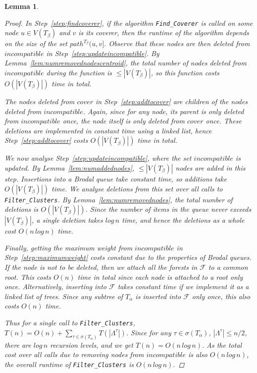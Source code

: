 \documentclass{article}
\newcommand{\leafset}{\Lambda}
\newcommand{\TA}{T_\alpha}
\newcommand{\TB}{T_\beta}
\newtheorem{filterclustersruntime}[incompatibility]{Lemma}
\begin{document}
\begin{filterclustersruntime}
\begin{proof}
            In Step~\ref{step:findcoverer}, if the algorithm \texttt{Find\_Coverer} is called on some node $u \in V(\TB)$ and $v$ is its coverer, then the runtime of the algorithm depends on the size of the set $path^{\TB}(u, v]$. Observe that these nodes are then deleted from $incompatible$ in Step~\ref{step:updateincompatible}. By Lemma~\ref{lem:numremovednodescentroid}, the total number of nodes deleted from $incompatible$ during the function is $\leq |V(\TB)|$, so this function costs $O(|V(\TB)|)$ time in total.

            The nodes deleted from $cover$ in Step~\ref{step:addtocover} are children of the nodes deleted from $incompatible$. Again, since for any node, its parent is only deleted from $incompatible$ once, the node itself is only deleted from $cover$ once. These deletions are implemented in constant time using a linked list, hence Step~\ref{step:addtocover} costs $O(|V(\TB)|)$ time in total.

            We now analyse Step~\ref{step:updateincompatible}, where the set $incompatible$ is updated. By Lemma~\ref{lem:numaddednodes}, $\leq |V(\TB)|$ nodes are added in this step. Insertions into a Brodal queue take constant time, so additions take $O(|V(\TB)|)$ time. We analyse deletions from this set over \textit{all} calls to \texttt{Filter\_Clusters}. By Lemma~\ref{lem:numremovednodes}, the total number of deletions is $O(|V(\TB)|)$. Since the number of items in the queue never exceeds $|V(\TB)|$, a single deletion takes $log\,n$ time, and hence the deletions as a whole cost $O(n\,log\,n)$ time.

            Finally, getting the maximum weight from $incompatible$ in Step~\ref{step:maximumweight} costs constant due to the properties of Brodal queues. If the node is not to be deleted, then we attach all the forests in $\mathcal{F}$ to a common root. This costs $O(n)$ time in total since each node is attached to a root only once. Alternatively, inserting into $\mathcal{F}$ takes constant time if we implement it as a linked list of trees. Since any subtree of $\TA$ is inserted into $\mathcal{F}$ only once, this also costs $O(n)$ time.

            Thus for a single call to \texttt{Filter\_Clusters}, $T(n) = O(n) + \sum_{\tau \in \sigma(\TA)} T(|\leafset^{\tau}|)$. Since for any $\tau \in \sigma(\TA)$, $|\leafset^{\tau}| \leq n/2$, there are $log\,n$ recursion levels, and we get $T(n) = O(n\,log\,n)$. As the total cost over all calls due to removing nodes from $incompatible$ is also $O(n\,log\,n)$, the overall runtime of \texttt{Filter\_Clusters} is $O(n\,log\,n)$.
        \end{proof}
    \end{filterclustersruntime}
\end{document}
